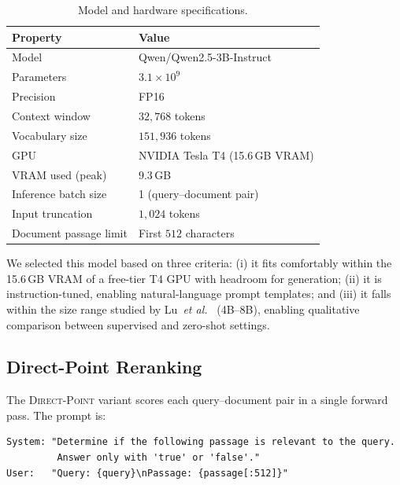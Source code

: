 \documentclass[12pt]{article}
\newcommand{\direct}{\textsc{Direct-Point}}
\newcommand{\etal}{\textit{et al.}}
\begin{document}
\begin{table}[htbp]
\caption{Model and hardware specifications.}
\label{tab:model_specs}
\centering
\small
\renewcommand{\arraystretch}{1.3}
\begin{tabular}{@{}ll@{}}
\toprule
\textbf{Property}          & \textbf{Value} \\
\midrule
Model                      & Qwen/Qwen2.5-3B-Instruct \\
Parameters                 & $3.1 \times 10^9$ \\
Precision                  & FP16 \\
Context window             & $32{,}768$ tokens \\
Vocabulary size            & $151{,}936$ tokens \\
GPU                        & NVIDIA Tesla T4 (15.6\,GB VRAM) \\
VRAM used (peak)           & $9.3$\,GB \\
Inference batch size       & 1 (query--document pair) \\
Input truncation           & $1{,}024$ tokens \\
Document passage limit     & First $512$ characters \\
\bottomrule
\end{tabular}
\end{table}

We selected this model based on three criteria: (i) it fits comfortably within
the 15.6\,GB VRAM of a free-tier T4 GPU with headroom for generation;
(ii) it is instruction-tuned, enabling natural-language prompt templates;
and (iii) it falls within the size range studied by
Lu~\etal~\citep{lu2025rethinking} (4B--8B), enabling qualitative comparison
between supervised and zero-shot settings.

\subsection{Direct-Point Reranking}
\label{sec:direct}

The \direct{} variant scores each query--document pair in a single forward pass.
The prompt is:

\begin{lstlisting}[language={}, caption={Direct-Point prompt template.}, label={lst:direct}]
System: "Determine if the following passage is relevant to the query.
         Answer only with 'true' or 'false'."
User:   "Query: {query}\nPassage: {passage[:512]}"
\end{lstlisting}
\end{document}
